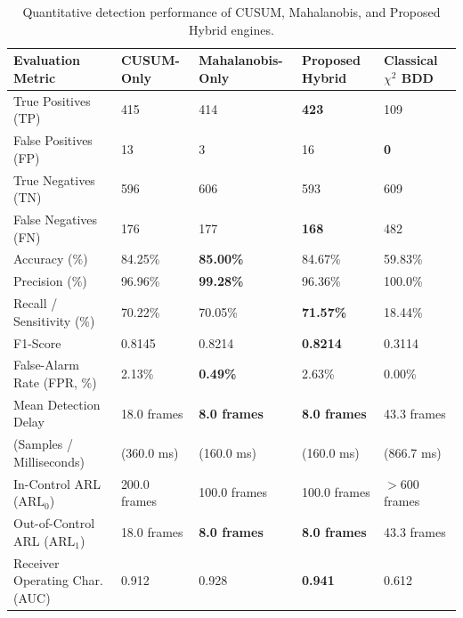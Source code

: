 \documentclass[12pt,a4paper]{report}
\begin{document}
\begin{table}[H]
\centering
\caption{Quantitative detection performance of CUSUM, Mahalanobis, and Proposed Hybrid engines.}
\label{tab:detection_performance}
\small
\renewcommand{\arraystretch}{1.25}
\begin{tabular}{|p{4.2cm}|p{2.2cm}|p{2.4cm}|p{2.4cm}|p{2.4cm}|}
\hline
\textbf{Evaluation Metric} & \textbf{CUSUM-Only} & \textbf{Mahalanobis-Only} & \textbf{Proposed Hybrid} & \textbf{Classical $\chi^2$ BDD} \\
\hline
True Positives (TP) & 415 & 414 & \textbf{423} & 109 \\
\hline
False Positives (FP) & 13 & 3 & 16 & \textbf{0} \\
\hline
True Negatives (TN) & 596 & 606 & 593 & 609 \\
\hline
False Negatives (FN) & 176 & 177 & \textbf{168} & 482 \\
\hline
Accuracy (\%) & 84.25\% & \textbf{85.00\%} & 84.67\% & 59.83\% \\
\hline
Precision (\%) & 96.96\% & \textbf{99.28\%} & 96.36\% & 100.0\% \\
\hline
Recall / Sensitivity (\%) & 70.22\% & 70.05\% & \textbf{71.57\%} & 18.44\% \\
\hline
F1-Score & 0.8145 & 0.8214 & \textbf{0.8214} & 0.3114 \\
\hline
False-Alarm Rate (FPR, \%) & 2.13\% & \textbf{0.49\%} & 2.63\% & 0.00\% \\
\hline
Mean Detection Delay & 18.0 frames & \textbf{8.0 frames} & \textbf{8.0 frames} & 43.3 frames \\
(Samples / Milliseconds) & (360.0 ms) & (160.0 ms) & (160.0 ms) & (866.7 ms) \\
\hline
In-Control ARL ($\text{ARL}_0$) & 200.0 frames & 100.0 frames & 100.0 frames & $> 600$ frames \\
\hline
Out-of-Control ARL ($\text{ARL}_1$) & 18.0 frames & \textbf{8.0 frames} & \textbf{8.0 frames} & 43.3 frames \\
\hline
Receiver Operating Char. (AUC)& 0.912 & 0.928 & \textbf{0.941} & 0.612 \\
\hline
\end{tabular}
\end{table}
\end{document}
